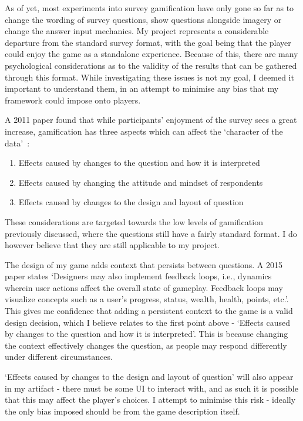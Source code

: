 As of yet, most experiments into survey gamification have only gone so far as to change the wording of survey questions, show questions alongside imagery or change the answer input mechanics.
My project represents a considerable departure from the standard survey format, with the goal being that the player could enjoy the game as a standalone experience. 
Because of this, there are many psychological considerations as to the validity of the results that can be gathered through this format. 
While investigating these issues is not my goal, I deemed it important to understand them, in an attempt to minimise any bias that my framework could impose onto players.

A 2011 paper found that while participants' enjoyment of the survey sees a great increase, gamification has three aspects which can affect the `character of the data'~\cite{GameExperiments}:
\begin{enumerate}
    \item Effects caused by changes to the question and how it is interpreted
    \item Effects caused by changing the attitude and mindset of respondents
    \item Effects caused by changes to the design and layout of question
\end{enumerate}
These considerations are targeted towards the low levels of gamification previously discussed, where the questions still have a fairly standard format. 
I do however believe that they are still applicable to my project. 

The design of my game adds context that persists between questions. 
A 2015 paper\cite{Olympic} states `Designers may also implement feedback loops, i.e., dynamics wherein user actions affect the overall state of gameplay. Feedback loops may visualize concepts such as a user’s progress, status, wealth, health, points, etc.'. 
This gives me confidence that adding a persistent context to the game is a valid design decision, which I believe relates to the first point above - `Effects caused by changes to the question and how it is interpreted'. This is because changing the context effectively changes the question, as people may respond differently under different circumstances. 

`Effects caused by changes to the design and layout of question' will also appear in my artifact - there must be some UI to interact with, and as such it is possible that this may affect the player's choices. I attempt to minimise this risk - ideally the only bias imposed should be from the game description itself.

